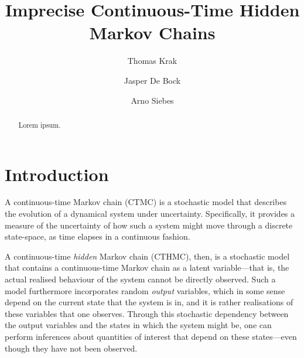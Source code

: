 \documentclass[twoside,11pt]{article}
\title{Imprecise Continuous-Time Hidden Markov Chains}
\author{Thomas Krak \and Jasper De Bock \and Arno Siebes}
\begin{document}


\date{}
\maketitle



\begin{abstract}
Lorem ipsum.
\end{abstract}

\section{Introduction}\label{sec:introduction}

A continuous-time Markov chain (CTMC) is a stochastic model that describes the evolution of a dynamical system under uncertainty. Specifically, it provides a measure of the uncertainty of how such a system might move through a discrete state-space, as time elapses in a continuous fashion.

A continuous-time \emph{hidden} Markov chain (CTHMC), then, is a stochastic model that contains a continuous-time Markov chain as a latent variable---that is, the actual realised behaviour of the system cannot be directly observed. Such a model furthermore incorporates random \emph{output} variables, which in some sense depend on the current state that the system is in, and it is rather realisations of these variables that one observes. Through this stochastic dependency between the output variables and the states in which the system might be, one can perform inferences about quantities of interest that depend on these states---even though they have not been observed.
\end{document}

